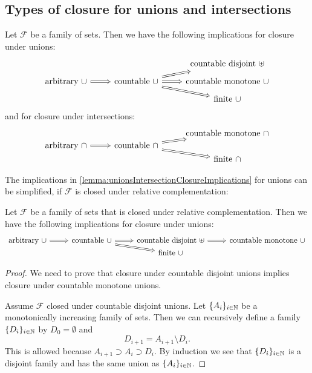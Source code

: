 \subsection{Types of closure for unions and intersections}
\begin{lemma} \label{lemma:unionsIntersectionClosureImplications}
Let $\mathcal{F}$ be a family of sets. Then we have the following implications for closure under unions:
\[ \begin{tikzcd}[row sep=tiny]
&& \text{countable disjoint $\uplus$} \\
\text{arbitrary $\cup$} \arrow[r, Rightarrow] & \text{countable $\cup$} \arrow[ur, Rightarrow] \arrow[r, Rightarrow] \arrow[dr, Rightarrow] & \text{countable monotone $\cup$} \\
&& \text{finite $\cup$}
\end{tikzcd} \]
and for closure under intersections:
\[ \begin{tikzcd}[row sep=0em]
&& \text{countable monotone $\cap$} \\
\text{arbitrary $\cap$} \arrow[r, Rightarrow] & \text{countable $\cap$} \arrow[ur, Rightarrow] \arrow[dr, Rightarrow] &  \\
&& \text{finite $\cap$}
\end{tikzcd} \]
\end{lemma}


The implications in \ref{lemma:unionsIntersectionClosureImplications} for unions can be simplified, if $\mathcal{F}$ is closed under relative complementation:
\begin{lemma} \label{lemma:typesOfUnionsRelativeComplementation}
Let $\mathcal{F}$ be a family of sets that is closed under relative complementation. Then we have the following implications for closure under unions:
\[ \begin{tikzcd}[row sep=0em]
\text{arbitrary $\cup$} \arrow[r, Rightarrow] & \text{countable $\cup$} \arrow[r, Rightarrow] \arrow[dr, Rightarrow] & \text{countable disjoint $\uplus$} \arrow[r, Rightarrow] & \text{countable monotone $\cup$} \\
&& \text{finite $\cup$} &
\end{tikzcd} \]
\end{lemma}
\begin{proof}
We need to prove that closure under countable disjoint unions implies closure under countable monotone unions.

Assume $\mathcal{F}$ closed under countable disjoint unions. Let $\{A_i\}_{i\in \mathbb{N}}$ be a monotonically increasing family of sets. Then we can recursively define a family $\{D_i\}_{i\in \mathbb{N}}$ by $D_0=\emptyset$ and
\[ D_{i+1} = A_{i+1}\setminus D_i. \]
This is allowed because $A_{i+1}\supset A_i \supset D_i$. By induction we see that $\{D_i\}_{i\in \mathbb{N}}$ is a disjoint family and has the same union as $\{A_i\}_{i\in \mathbb{N}}$.
\end{proof}

